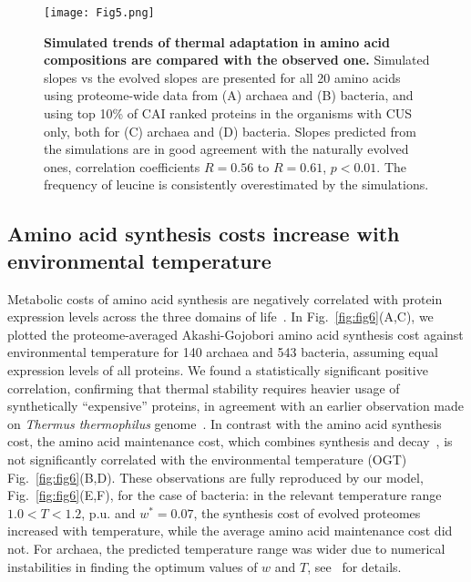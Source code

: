 \documentclass[10pt,letterpaper]{article}
\begin{document}
\begin{figure}[h!]
\texttt{[image: Fig5.png]}
\caption{
{\bf Simulated trends of thermal adaptation in amino acid compositions are compared with the observed one.} Simulated slopes vs the evolved slopes are presented for all 20 amino acids using proteome-wide data from (A) archaea and (B) bacteria, and using top 10\% of CAI ranked proteins in the organisms with CUS only, both for (C) archaea and (D) bacteria. Slopes predicted from the simulations are in good agreement with the naturally evolved ones, correlation coefficients $R=0.56$ to $R=0.61$, $p<0.01$. The frequency of leucine is consistently overestimated by the simulations.
}
\label{fig:fig5}
\end{figure}


\subsection*{Amino acid synthesis costs increase with environmental temperature}

Metabolic costs of amino acid synthesis are negatively correlated with protein expression levels across the three domains of life~\cite{Akashi2002Metabolic,Swire2007Selection}. In Fig.~\ref{fig:fig6}(A,C), we plotted the proteome-averaged Akashi-Gojobori amino acid synthesis cost against environmental temperature for 140 archaea and 543 bacteria, assuming equal expression levels of all proteins. We found a statistically significant positive correlation, confirming that thermal stability requires heavier usage of synthetically ``expensive'' proteins, in agreement with an earlier observation made on {\it Thermus thermophilus} genome~\cite{Swire2007Selection}. In contrast with the amino acid synthesis cost, the amino acid maintenance cost, which combines synthesis and decay~\cite{Krick2014Amino}, is not significantly correlated with the environmental temperature (OGT) Fig.~\ref{fig:fig6}(B,D). These observations are fully reproduced by our model, Fig.~\ref{fig:fig6}(E,F), for the case of bacteria: in the relevant temperature range $1.0 < T < 1.2$, p.u. and $w^*=0.07$, the synthesis cost of evolved proteomes increased with temperature, while the average amino acid maintenance cost did not. For archaea, the predicted temperature range was wider due to numerical instabilities in finding the optimum values of $w$ and $T$, see~ for details.
\end{document}
